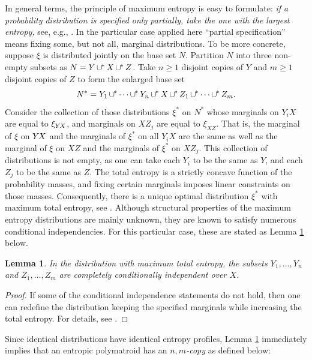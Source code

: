 \documentclass[reqno]{amsart}
\newtheorem{lemma}[theorem]{Lemma}
\theoremstyle{definition}
\renewcommand\ge{\geqslant}\renewcommand\le{\leqslant}
\newcommand\cups{\mathrel{\cup\mkern -1mu^*\mkern-3mu}}
\renewcommand\cups{\mathop{{\cup}\mkern -2mu ^*}}
\def\YX{Y\mkern-2mu X}
\begin{document}
In general terms, the principle of maximum entropy is easy to formulate:
\emph{if a probability distribution is specified only partially, take the
one with the largest entropy,} see, e.g., \cite{maxentp}. In the particular
case applied here ``partial specification'' means fixing some, but not all,
marginal distributions. To be more concrete, suppose $\xi$ is distributed
jointly on the base set $N$. Partition $N$ into three non-empty subsets as
$N= Y\cups X\cups Z$. Take $n\ge 1$ disjoint copies of $Y$ and $m\ge 1$
disjoint copies of $Z$ to form the enlarged base set
$$
  N^* = Y_1\cups \cdots \cups Y_n \cups X \cups Z_1\cups \cdots\cups Z_m.
$$
Consider the collection of those distributions $\xi^*$ on $N^*$ whose
marginals on $Y_iX$ are equal to $\xi_{\YX}$, and marginals on $XZ_j$ are
equal to $\xi_{XZ}$. That is, the marginal of $\xi$ on $\YX$ and the
marginals of $\xi^*$ on all $Y_iX$ are the same as well as the marginal of
$\xi$ on $XZ$ and the marginals of $\xi^*$ on $XZ_j$. This collection of
distributions is not empty, as one can take each $Y_i$ to be the same as
$Y$, and each $Z_j$ to be the same as $Z$. The total entropy is a strictly
concave function of the probability masses, and fixing certain marginals
imposes linear constraints on those masses. Consequently, there is a unique
optimal distribution $\xi^*$ with maximum total entropy, see
\cite{convex-optim}. Although structural properties of the maximum entropy
distributions are mainly unknown, they are known to satisfy numerous
conditional independencies. For this particular case, these are stated as
Lemma \ref{lemma:maxent1} below.

\begin{lemma}\label{lemma:maxent1}
In the distribution with maximum total entropy, the subsets $Y_1,\dots,
Y_n$ and $Z_1,\dots, Z_m$ are completely conditionally independent
over $X$.
\end{lemma}

\begin{proof}
If some of the conditional independence statements do not hold,
then one can redefine the distribution keeping the specified
marginals while increasing the total entropy. For details, see
\cite{exploring}.
\end{proof}

Since identical distributions have identical entropy profiles, Lemma
\ref{lemma:maxent1} immediately implies that an entropic polymatroid
has an \emph{$n,m$-copy} as defined below:
\end{document}
